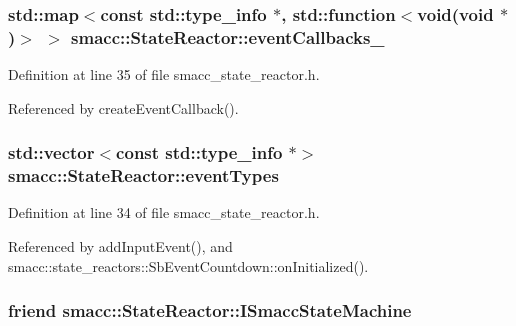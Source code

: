 \subsubsection[{\texorpdfstring{event\+Callbacks\+\_\+}{eventCallbacks_}}]{\setlength{\rightskip}{0pt plus 5cm}std\+::map$<$const std\+::type\+\_\+info $\ast$, std\+::function$<$void(void $\ast$)$>$ $>$ smacc\+::\+State\+Reactor\+::event\+Callbacks\+\_\+}\hypertarget{classsmacc_1_1StateReactor_a63cce05c412f3699cc1b15af9aeaf8af}{}\label{classsmacc_1_1StateReactor_a63cce05c412f3699cc1b15af9aeaf8af}


Definition at line 35 of file smacc\+\_\+state\+\_\+reactor.\+h.



Referenced by create\+Event\+Callback().

\subsubsection[{\texorpdfstring{event\+Types}{eventTypes}}]{\setlength{\rightskip}{0pt plus 5cm}std\+::vector$<$const std\+::type\+\_\+info $\ast$$>$ smacc\+::\+State\+Reactor\+::event\+Types}\hypertarget{classsmacc_1_1StateReactor_a65c8ddfce40e7859e5c73fff1cf6c04b}{}\label{classsmacc_1_1StateReactor_a65c8ddfce40e7859e5c73fff1cf6c04b}


Definition at line 34 of file smacc\+\_\+state\+\_\+reactor.\+h.



Referenced by add\+Input\+Event(), and smacc\+::state\+\_\+reactors\+::\+Sb\+Event\+Countdown\+::on\+Initialized().

\subsubsection[{\texorpdfstring{I\+Smacc\+State\+Machine}{ISmaccStateMachine}}]{\setlength{\rightskip}{0pt plus 5cm}friend smacc\+::\+State\+Reactor\+::\+I\+Smacc\+State\+Machine\hspace{0.3cm}{\ttfamily [private]}}\hypertarget{classsmacc_1_1StateReactor_ad488bca73fa841277318d8b94c3a9421}{}\label{classsmacc_1_1StateReactor_ad488bca73fa841277318d8b94c3a9421}


